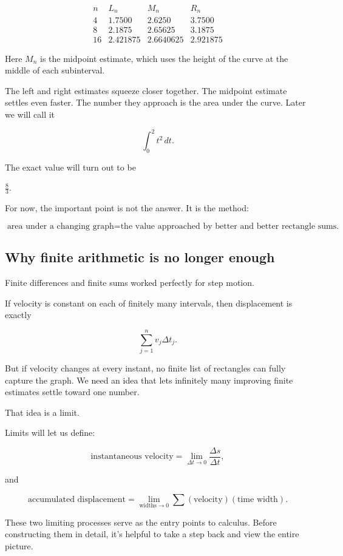 \[
\begin{array}{c|ccc}
n & L_n & M_n & R_n \\ \hline
4  & 1.7500 & 2.6250 & 3.7500\\
8  & 2.1875 & 2.65625 & 3.1875\\
16 & 2.421875 & 2.6640625 & 2.921875
\end{array}
\]

Here \(M_n\) is the midpoint estimate, which uses the height of the curve at the middle of each subinterval.

The left and right estimates squeeze closer together. The midpoint estimate settles even faster. The number they approach is the area under the curve. Later we will call it

\[
\int_0^2 t^2\,dt.
\]

The exact value will turn out to be

\(
\frac83.
\)

For now, the important point is not the answer. It is the method:

\[
\boxed{
\text{area under a changing graph}
=
\text{the value approached by better and better rectangle sums.}
}
\]

\subsection{Why finite arithmetic is no longer enough}

Finite differences and finite sums worked perfectly for step motion.

If velocity is constant on each of finitely many intervals, then displacement is exactly

\[
\sum_{j=1}^{n} v_j\Delta t_j.
\]

But if velocity changes at every instant, no finite list of rectangles can fully capture the graph. We need an idea that lets infinitely many improving finite estimates settle toward one number.

That idea is a limit.

Limits will let us define:

\[
\text{instantaneous velocity}
=
\lim_{\Delta t\to0}
\frac{\Delta s}{\Delta t},
\]

and

\[
\text{accumulated displacement}
=
\lim_{\text{widths}\to0}
\sum (\text{velocity})(\text{time width}).
\]

These two limiting processes serve as the entry points to calculus. Before constructing them in detail, it’s helpful to take a step back and view the entire picture.

